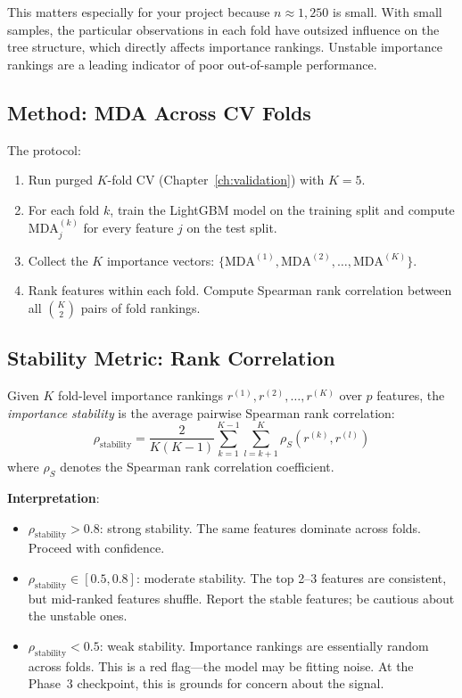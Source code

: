 This matters especially for your project because $n \approx 1{,}250$ is small.
With small samples, the particular observations in each fold have outsized influence on the tree structure, which directly affects importance rankings.
Unstable importance rankings are a leading indicator of poor out-of-sample performance.

\subsection{Method: MDA Across CV Folds}

The protocol:
\begin{enumerate}[nosep]
  \item Run purged $K$-fold CV (Chapter~\ref{ch:validation}) with $K = 5$.
  \item For each fold $k$, train the LightGBM model on the training split and compute $\mathrm{MDA}_j^{(k)}$ for every feature $j$ on the test split.
  \item Collect the $K$ importance vectors: $\{\mathrm{MDA}^{(1)}, \mathrm{MDA}^{(2)}, \ldots, \mathrm{MDA}^{(K)}\}$.
  \item Rank features within each fold. Compute Spearman rank correlation between all $\binom{K}{2}$ pairs of fold rankings.
\end{enumerate}

\subsection{Stability Metric: Rank Correlation}

\begin{definition}
Given $K$ fold-level importance rankings $r^{(1)}, r^{(2)}, \ldots, r^{(K)}$ over $p$ features, the \emph{importance stability} is the average pairwise Spearman rank correlation:
\begin{equation}
\rho_{\mathrm{stability}} = \frac{2}{K(K-1)} \sum_{k=1}^{K-1} \sum_{l=k+1}^K \rho_S\!\left(r^{(k)}, r^{(l)}\right)
\label{eq:stability-metric}
\end{equation}
where $\rho_S$ denotes the Spearman rank correlation coefficient.
\end{definition}

\textbf{Interpretation}:
\begin{itemize}[nosep]
  \item $\rho_{\mathrm{stability}} > 0.8$: strong stability. The same features dominate across folds. Proceed with confidence.
  \item $\rho_{\mathrm{stability}} \in [0.5, 0.8]$: moderate stability. The top 2--3 features are consistent, but mid-ranked features shuffle. Report the stable features; be cautious about the unstable ones.
  \item $\rho_{\mathrm{stability}} < 0.5$: weak stability. Importance rankings are essentially random across folds. This is a red flag---the model may be fitting noise. At the Phase~3 checkpoint, this is grounds for concern about the signal.
\end{itemize}

